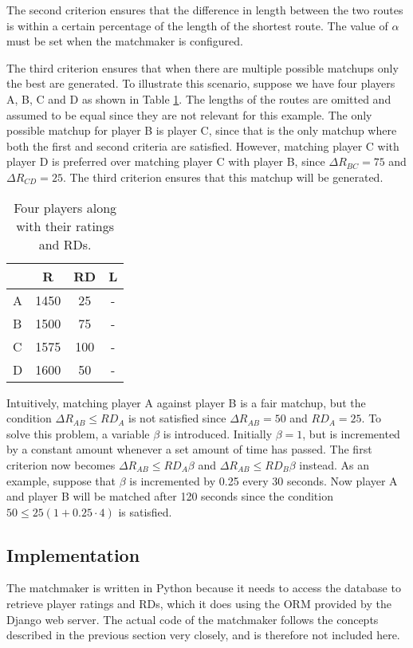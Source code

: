 The second criterion ensures that the difference in length between the two routes is within a certain percentage of the length of the shortest route.
The value of $\alpha$ must be set when the matchmaker is configured.

The third criterion ensures that when there are multiple possible matchups only the best are generated.
To illustrate this scenario, suppose we have four players A, B, C and D as shown in Table \ref{tab:matchmaker_ex}.
The lengths of the routes are omitted and assumed to be equal since they are not relevant for this example.
The only possible matchup for player B is player C, since that is the only matchup where both the first and second criteria are satisfied.
However, matching player C with player D is preferred over matching player C with player B, since $\Delta R_{BC} = 75$ and $\Delta R_{CD} = 25$.
The third criterion ensures that this matchup will be generated.

\begin{table}[!ht]
	\centering
	\begin{tabular}{l c c c}
			& R		& RD	& L \\
		\hline
		A	& 1450	& 25	& - \\
		B	& 1500	& 75	& - \\
		C	& 1575	& 100	& - \\
		D	& 1600	& 50	& -
	\end{tabular}
	\caption{Four players along with their ratings and RDs.}
	\label{tab:matchmaker_ex}
\end{table}

Intuitively, matching player A against player B is a fair matchup, but the condition $\Delta R_{AB} \leq RD_A$ is not satisfied since $\Delta R_{AB} = 50$ and $RD_A = 25$.
To solve this problem, a variable $\beta$ is introduced.
Initially $\beta = 1$, but is incremented by a constant amount whenever a set amount of time has passed.
The first criterion now becomes $\Delta R_{AB} \leq RD_A\beta$ and $\Delta R_{AB} \leq RD_B\beta$ instead.
As an example, suppose that $\beta$ is incremented by 0.25 every 30 seconds.
Now player A and player B will be matched after 120 seconds since the condition $50 \leq 25\left(1+0.25\cdot4\right)$ is satisfied.


\subsection{Implementation}
The matchmaker is written in Python because it needs to access the database to retrieve player ratings and RDs, which it does using the ORM provided by the Django web server.
The actual code of the matchmaker follows the concepts described in the previous section very closely, and is therefore not included here.

